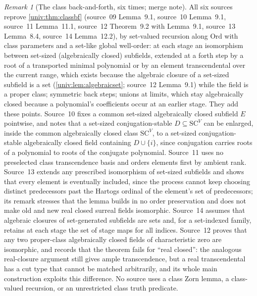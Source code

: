 \documentclass[11pt,letterpaper]{article}
\numberwithin{equation}{section}
\theoremstyle{definition}
\theoremstyle{remark}
\newtheorem{remark}[remark]{Remark}
\newcommand{\SC}{\mathrm{SC}}
\newcommand{\Ord}{\mathrm{Ord}}
\begin{document}
\begin{remark}[The class back-and-forth, six times; merge note]\label{univ:gs:rem:bfroutes}
All six sources reprove \cref{univ:thm:classbf} (source~09 Lemma~9.1, source~10 Lemma~9.1,
source~11 Lemma~11.1, source~12 Theorem~9.2 with Lemma~9.1, source~13 Lemma~8.4, source~14
Lemma~12.2), by set-valued recursion along $\Ord$ with class parameters and a set-like global
well-order: at each stage an isomorphism between set-sized (algebraically closed) subfields,
extended at a forth step by a root of a transported minimal polynomial or by an element
transcendental over the current range, which exists because the algebraic closure of a set-sized
subfield is a set (\cref{univ:lem:algebraicset}; source~12 Lemma~9.1) while the field is a proper
class; symmetric back steps; unions at limits, which stay algebraically closed because a
polynomial's coefficients occur at an earlier stage. They add these points. Source~10 fixes a
common set-sized algebraically closed subfield $E$ pointwise, and notes that a set-sized
conjugation-stable $D\subseteq\SC^V$ can be enlarged, inside the common algebraically closed class
$\SC^V$, to a set-sized conjugation-stable algebraically closed field containing $D\cup\{i\}$,
since conjugation carries roots of a polynomial to roots of the conjugate polynomial. Source~11
uses no preselected class transcendence basis and orders elements first by ambient rank. Source~13
extends any prescribed isomorphism of set-sized subfields and shows that every element is
eventually included, since the process cannot keep choosing distinct predecessors past the
Hartogs ordinal of the element's set of predecessors; its remark stresses that the lemma builds in
no order preservation and does not make old and new real closed surreal fields isomorphic.
Source~14 assumes that algebraic closures of set-generated subfields are sets and, for a
set-indexed family, retains at each stage the set of stage maps for all indices. Source~12 proves
that any two proper-class algebraically closed fields of characteristic zero are isomorphic, and
records that the theorem fails for ``real closed'': the analogous real-closure argument still
gives ample transcendence, but a real transcendental has a cut type that cannot be matched
arbitrarily, and its whole main construction exploits this difference. No source uses a class
Zorn lemma, a class-valued recursion, or an unrestricted class truth predicate.
\end{remark}
\end{document}
